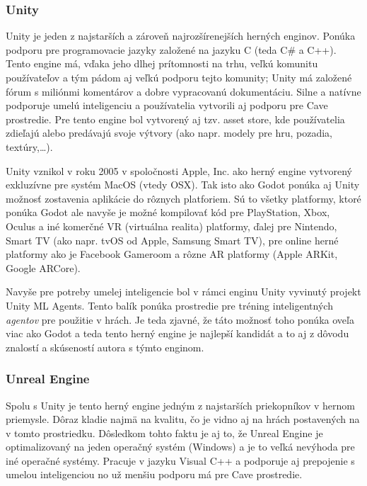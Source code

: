 \subsubsection{Unity}

Unity je jeden z najstarších a zároveň najrozšírenejších herných enginov.\cite{game_engine_unity}
Ponúka podporu pre programovacie jazyky založené na jazyku C (teda C\# a C++).
Tento engine má, vďaka jeho dlhej prítomnosti na trhu, veľkú komunitu používateľov a tým pádom aj veľkú podporu tejto
komunity;
Unity má založené fórum s miliónmi komentárov a dobre vypracovanú dokumentáciu.
Silne a natívne podporuje umelú inteligenciu\cite{game_engine_unity_ml_agents} a používatelia vytvorili aj podporu pre
Cave prostredie\cite{game_engine_unity_kave}.
Pre tento engine bol vytvorený aj tzv. asset store, kde používatelia zdieľajú alebo predávajú svoje výtvory (ako napr.
modely pre hru, pozadia, textúry,\dots).

Unity vznikol v roku 2005 v spoločnosti Apple, Inc. ako herný engine vytvorený exkluzívne pre systém MacOS (vtedy OSX).
Tak isto ako Godot ponúka aj Unity možnosť zostavenia aplikácie do rôznych platforiem.
Sú to všetky platformy, ktoré ponúka Godot ale navyše je možné kompilovať kód pre PlayStation, Xbox, Oculus a iné
komerčné VR (virtuálna realita) platformy, ďalej pre Nintendo, Smart TV (ako napr. tvOS od Apple, Samsung Smart TV),
pre online herné platformy ako je Facebook Gameroom a rôzne AR platformy (Apple ARKit, Google ARCore).

Navyše pre potreby umelej inteligencie bol v rámci enginu Unity vyvinutý projekt Unity ML Agents.
Tento balík ponúka prostredie pre tréning inteligentných \emph{agentov} pre použitie v hrách.
Je teda zjavné, že táto možnosť toho ponúka oveľa viac ako Godot a teda tento herný engine je najlepší kandidát a to
aj z dôvodu znalostí a skúseností autora s týmto enginom.

\subsubsection{Unreal Engine}

Spolu s Unity je tento herný engine jedným z najstarších priekopníkov v hernom
priemysle.\cite{game_engine_unreal_engine}
Dôraz kladie najmä na kvalitu, čo je vidno aj na hrách postavených na v tomto prostriedku.
Dôsledkom tohto faktu je aj to, že Unreal Engine je optimalizovaný na jeden operačný systém (Windows) a je to veľká
nevýhoda pre iné operačné systémy.
Pracuje v jazyku Visual C++ a podporuje aj prepojenie s umelou inteligenciou no už menšiu podporu má pre Cave
prostredie.

